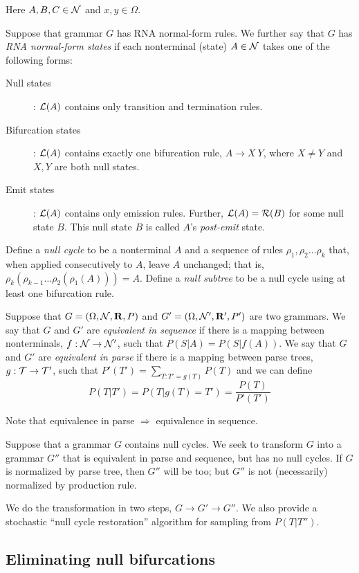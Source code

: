 \documentclass[10pt]{article}
\begin{document}
\noindent
Here $A,B,C \in {\cal N}$ and $x,y \in \Omega$.

Suppose that grammar $G$ has RNA normal-form rules.
We further say that $G$ has {\em RNA normal-form states} if
each nonterminal (state) $A \in {\cal N}$ takes one of the following forms:

\noindent \hrulefill
\begin{description}
\item[Null states]: ${\cal L}(A)$ contains only transition and termination rules.
\item[Bifurcation states]: ${\cal L}(A)$ contains exactly one bifurcation rule, $A \to X\ Y$, where $X \neq Y$ and $X,Y$ are both null states.
\item[Emit states]: ${\cal L}(A)$ contains only emission rules. Further, ${\cal L}(A) = {\cal R}(B)$ for some null state $B$.
This null state $B$ is called $A$'s {\em post-emit} state.
\end{description}
\noindent \hrulefill

Define a {\em null cycle} to be a nonterminal $A$
and a sequence of rules $\rho_1, \rho_2 \ldots \rho_k$ that, when applied consecutively to $A$, leave $A$ unchanged;
that is, $\rho_k(\rho_{k-1} \ldots \rho_2(\rho_1(A))) = A$.
Define a {\em null subtree} to be a null cycle using at least one bifurcation rule.

Suppose that $G = ( \Omega, {\cal N}, {\bf R}, P )$ and $G' = ( \Omega, {\cal N}', {\bf R}', P' )$ are two grammars.
We say that $G$ and $G'$ are {\em equivalent in sequence} if there is a mapping between nonterminals, $f:{\cal N} \to {\cal N}'$,
such that $P(S|A) = P(S|f(A))$.
We say that $G$ and $G'$ are {\em equivalent in parse} if there is a mapping between parse trees, $g:{\cal T} \to {\cal T}'$,
such that $P'(T') = \sum_{T:T'=g(T)} P(T)$ and we can define
\[
P(T|T') = P(T|g(T)=T') = \frac{P(T)}{P'(T')}
\]

Note that equivalence in parse $\Rightarrow$ equivalence in sequence.

Suppose that a grammar $G$ contains null cycles.
We seek to transform $G$ into a grammar $G''$ that is equivalent in parse and sequence, but has no null cycles.
If $G$ is normalized by parse tree, then $G''$ will be too; but $G''$ is not (necessarily) normalized by production rule.

We do the transformation in two steps, $G \to G' \to G''$.
We also provide a stochastic ``null cycle restoration'' algorithm for sampling from $P(T|T'')$.


\subsection{Eliminating null bifurcations}
\end{document}
